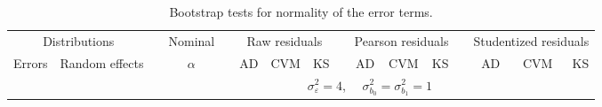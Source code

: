 
\begin{table}[ht]
\caption{\label{tab:boot1}Bootstrap tests for normality of the error terms.}
\begin{scriptsize}
\begin{center}
\begin{tabular}{ll p{.1cm} c p{.1cm} rrr p{.1cm} rrr p{.1cm} rrr}
  \hline
  \multicolumn{2}{c}{Distributions}& & Nominal & &  \multicolumn{3}{c}{Raw residuals} & & \multicolumn{3}{c}{Pearson residuals} & & \multicolumn{3}{c}{Studentized residuals}\\ \cline{1-2} \cline{6-8} \cline{10-12} \cline{14-16}
  Errors & Random effects & & $\alpha$ & & AD & CVM & KS & & AD & CVM & KS & & AD & CVM & KS \\ 
   \hline
& && && \multicolumn{9}{c}{$\sigma_{\varepsilon}^2 = 4$, \ \ $\sigma_{b_0}^2 = \sigma_{b_1}^2 = 1$} \\ \cline{6-16}


\end{tabular}
\end{center}
\end{scriptsize}
\end{table}
